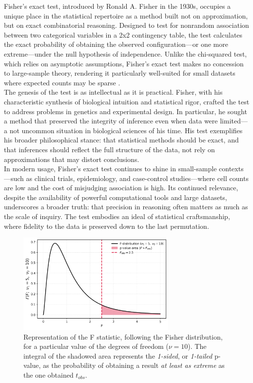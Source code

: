 \documentclass{book}
\begin{document}
Fisher’s exact test, introduced by Ronald A. Fisher in the 1930s, occupies a unique place in the statistical repertoire as a method built not on approximation, but on exact combinatorial reasoning. Designed to test for nonrandom association between two categorical variables in a 2x2 contingency table, the test calculates the exact probability of obtaining the observed configuration—or one more extreme—under the null hypothesis of independence. Unlike the chi-squared test, which relies on asymptotic assumptions, Fisher’s exact test makes no concession to large-sample theory, rendering it particularly well-suited for small datasets where expected counts may be sparse \cite{welch1947}.\\

The genesis of the test is as intellectual as it is practical. Fisher, with his characteristic synthesis of biological intuition and statistical rigor, crafted the test to address problems in genetics and experimental design. In particular, he sought a method that preserved the integrity of inference even when data were limited—a not uncommon situation in biological sciences of his time. His test exemplifies his broader philosophical stance: that statistical methods should be exact, and that inferences should reflect the full structure of the data, not rely on approximations that may distort conclusions.\\

In modern usage, Fisher’s exact test continues to shine in small-sample contexts—such as clinical trials, epidemiology, and case-control studies—where cell counts are low and the cost of misjudging association is high. Its continued relevance, despite the availability of powerful computational tools and large datasets, underscores a broader truth: that precision in reasoning often matters as much as the scale of inquiry. The test embodies an ideal of statistical craftsmanship, where fidelity to the data is preserved down to the last permutation.\\

\begin{figure}[ht]
    \centering
    \includegraphics[width=0.7\textwidth]{figures/chapter4/f_test_one_tailed.png}
    \caption{Representation of the F statistic, following the Fisher distribution, for a particular value of the degrees of freedom ($\nu = 10$). The integral of the shadowed area represents the \textit{1-sided}, or \textit{1-tailed} p-value, as the probability of obtaining a result \textit{at least as extreme} as the one obtained $t_{obs}$.}
    \label{fig:f_test1}
\end{figure}
\end{document}
